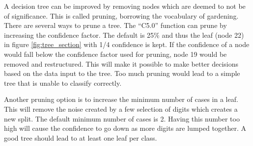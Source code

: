 A decision tree can be improved by removing nodes which are deemed to not be of significance.
This is called pruning, borrowing the vocabulary of gardening.
There are several ways to prune a tree.
The ``C5.0'' function can prune by increasing the confidence factor. 
The default is 25\% and thus the leaf (node 22) in figure \ref{fig:tree_section} with 1/4 confidence is kept.
If the confidence of a node would fall below the confidence factor used for pruning, node 19 would be removed and restructured.
This will make it possible to make better decisions based on the data input to the tree.
Too much pruning would lead to a simple tree that is unable to classify correctly.

Another pruning option is to increase the minimum number of cases in a leaf. 
This will remove the noise created by a few selection of digits which creates a new split.
The default minimum number of cases is 2.
Having this number too high will cause the confidence to go down as more digits are lumped together. 
A good tree should lead to at least one leaf per class.